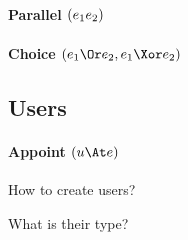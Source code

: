 \paragraph{Parallel $(e_1 \relax e_2)$}




\paragraph{Choice $(e_1 \Or e_2, e_1 \Xor e_2)$}




\subsection{Users}

\paragraph{Appoint $(u \At e)$}

\begin{itemize*}
  \item How to create users?
  \item What is their type?
\end{itemize*}
